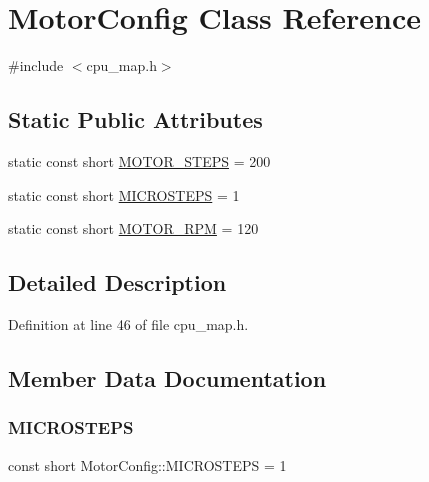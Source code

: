 \hypertarget{class_motor_config}{}\section{Motor\+Config Class Reference}
\label{class_motor_config}


{\ttfamily \#include $<$cpu\+\_\+map.\+h$>$}

\subsection*{Static Public Attributes}
\begin{DoxyCompactItemize}
\item 
static const short \hyperlink{class_motor_config_a7c9848ce827ad884f69001c8517178a7}{M\+O\+T\+O\+R\+\_\+\+S\+T\+E\+PS} = 200
\item 
static const short \hyperlink{class_motor_config_a9671c799866d18d9bec915fc6b55f7b8}{M\+I\+C\+R\+O\+S\+T\+E\+PS} = 1
\item 
static const short \hyperlink{class_motor_config_abe3fe3efcce60033bf58a93fda1c1011}{M\+O\+T\+O\+R\+\_\+\+R\+PM} = 120
\end{DoxyCompactItemize}


\subsection{Detailed Description}


Definition at line 46 of file cpu\+\_\+map.\+h.



\subsection{Member Data Documentation}
\mbox{\label{class_motor_config_a9671c799866d18d9bec915fc6b55f7b8}} 
\subsubsection{\texorpdfstring{M\+I\+C\+R\+O\+S\+T\+E\+PS}{MICROSTEPS}}
{\footnotesize\ttfamily const short Motor\+Config\+::\+M\+I\+C\+R\+O\+S\+T\+E\+PS = 1\hspace{0.3cm}{\ttfamily [static]}}



